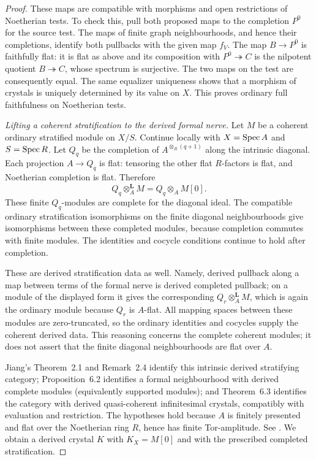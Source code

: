 \begin{proof}
These maps are compatible with morphisms and open restrictions of Noetherian tests.  To check this, pull both proposed maps to the completion $P^0$ for the source test.  The maps of finite graph neighbourhoods, and hence their completions, identify both pullbacks with the given map $f_V$.  The map $B\to P^0$ is faithfully flat: it is flat as above and its composition with $P^0\twoheadrightarrow C$ is the nilpotent quotient $B\twoheadrightarrow C$, whose spectrum is surjective.  The two maps on the test are consequently equal.  The same equalizer uniqueness shows that a morphism of crystals is uniquely determined by its value on $X$.  This proves ordinary full faithfulness on Noetherian tests.

\emph{Lifting a coherent stratification to the derived formal nerve.}
Let $M$ be a coherent ordinary stratified module on $X/S$.  Continue locally with $X=\operatorname{Spec} A$ and $S=\operatorname{Spec} R$.  Let $Q_q$ be the completion of $A^{\otimes_R(q+1)}$ along the intrinsic diagonal.  Each projection $A\to Q_q$ is flat: tensoring the other flat $R$-factors is flat, and Noetherian completion is flat.  Therefore
\[
                    Q_q\otimes_A^{\mathbf L}M=Q_q\otimes_AM[0].
\]
These finite $Q_q$-modules are complete for the diagonal ideal.  The compatible ordinary stratification isomorphisms on the finite diagonal neighbourhoods give isomorphisms between these completed modules, because completion commutes with finite modules.  The identities and cocycle conditions continue to hold after completion.

These are derived stratification data as well.  Namely, derived pullback along a map between terms of the formal nerve is derived completed pullback; on a module of the displayed form it gives the corresponding $Q_r\otimes_A^{\mathbf L}M$, which is again the ordinary module because $Q_r$ is $A$-flat.  All mapping spaces between these modules are zero-truncated, so the ordinary identities and cocycles supply the coherent derived data.  This reasoning concerns the complete coherent modules; it does not assert that the finite diagonal neighbourhoods are flat over $A$.

Jiang's Theorem~2.1 and Remark~2.4 identify this intrinsic derived stratifying category; Proposition~6.2 identifies a formal neighbourhood with derived complete modules (equivalently supported modules); and Theorem~6.3 identifies the category with derived quasi-coherent infinitesimal crystals, compatibly with evaluation and restriction.  The hypotheses hold because $A$ is finitely presented and flat over the Noetherian ring $R$, hence has finite Tor-amplitude.  See \citet[pp.~16--17, 32--34; also Theorem~B.5, pp.~43--45]{Jiang2023Derived}.  We obtain a derived crystal $K$ with $K_X=M[0]$ and with the prescribed completed stratification.


\end{proof}
